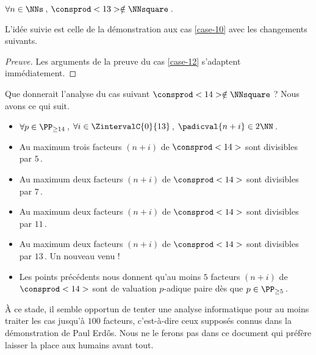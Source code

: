 \begin{fact} \label{case-13}
	 $\forall n \in \NNs$\,, $\consprod<13> \notin \NNsquare$\,.
\end{fact}




L'idée suivie est celle de la démonstration aux cas \ref{case-10} avec les changements suivants.


\begin{proof}[Preuve]%
    Les arguments de la preuve du cas \ref{case-12} s'adaptent immédiatement.
\end{proof}




\begin{remark}
	Que donnerait l'analyse du cas suivant $\consprod<14> \notin \NNsquare$ ?
	Nous avons ce qui suit.
    \begin{itemize}
		\item $\forall p \in \PP_{\geq 14}$\,, 
    $\forall i \in \ZintervalC{0}{13}$\,, 
    $\padicval{n + i} \in 2 \NN$\,.
		
		\item Au maximum trois facteurs $(n + i)$ de $\consprod<14>$ sont divisibles par $5$\,.

		\item Au maximum deux facteurs $(n + i)$ de $\consprod<14>$ sont divisibles par $7$\,.

		\item Au maximum deux facteurs $(n + i)$ de $\consprod<14>$ sont divisibles par $11$\,.

		\item Au maximum deux facteurs $(n + i)$ de $\consprod<14>$ sont divisibles par $13$\,. Un nouveau venu !

		\item Les points précédents nous donnent qu'au moins $5$ facteurs $(n + i)$ de $\consprod<14>$ sont de valu\-ation $p$-adique paire dès que $p \in \PP_{\geq 5}$\,.
    \end{itemize}
    
    À ce stade, il semble opportun de tenter une analyse informatique pour au moins traiter les cas jusqu'à $100$ facteurs, c'est-à-dire ceux supposés connus dans la démonstration de Paul Erdős. Nous ne le ferons pas dans ce document qui préfère laisser la place aux humains avant tout.
\end{remark}
